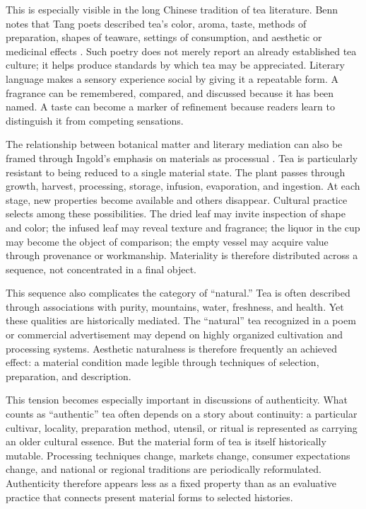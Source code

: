 \documentclass[numbers]{IntechOpen-Book}
\begin{document}
This is especially visible in the long Chinese tradition of tea literature. Benn notes that Tang poets described tea's color, aroma, taste, methods of preparation, shapes of teaware, settings of consumption, and aesthetic or medicinal effects \cite{benn2015poetry}. Such poetry does not merely report an already established tea culture; it helps produce standards by which tea may be appreciated. Literary language makes a sensory experience social by giving it a repeatable form. A fragrance can be remembered, compared, and discussed because it has been named. A taste can become a marker of refinement because readers learn to distinguish it from competing sensations.

The relationship between botanical matter and literary mediation can also be framed through Ingold's emphasis on materials as processual \cite{ingold2007}. Tea is particularly resistant to being reduced to a single material state. The plant passes through growth, harvest, processing, storage, infusion, evaporation, and ingestion. At each stage, new properties become available and others disappear. Cultural practice selects among these possibilities. The dried leaf may invite inspection of shape and color; the infused leaf may reveal texture and fragrance; the liquor in the cup may become the object of comparison; the empty vessel may acquire value through provenance or workmanship. Materiality is therefore distributed across a sequence, not concentrated in a final object.

This sequence also complicates the category of ``natural.'' Tea is often described through associations with purity, mountains, water, freshness, and health. Yet these qualities are historically mediated. The ``natural'' tea recognized in a poem or commercial advertisement may depend on highly organized cultivation and processing systems. Aesthetic naturalness is therefore frequently an achieved effect: a material condition made legible through techniques of selection, preparation, and description.

This tension becomes especially important in discussions of authenticity. What counts as ``authentic'' tea often depends on a story about continuity: a particular cultivar, locality, preparation method, utensil, or ritual is represented as carrying an older cultural essence. But the material form of tea is itself historically mutable. Processing techniques change, markets change, consumer expectations change, and national or regional traditions are periodically reformulated. Authenticity therefore appears less as a fixed property than as an evaluative practice that connects present material forms to selected histories.
\end{document}
